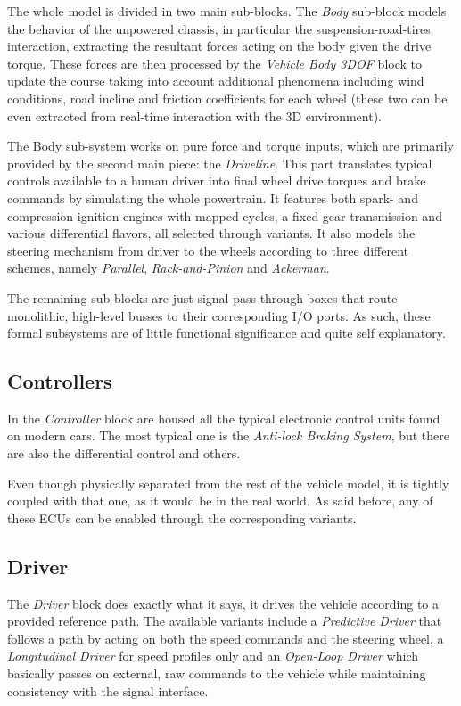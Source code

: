 		The whole model is divided in two main sub-blocks. The \emph{Body} sub-block models the behavior of the unpowered chassis, in particular the suspension-road-tires
		interaction, extracting the resultant forces acting on the body given the drive torque. These forces are then processed by the \emph{Vehicle Body 3DOF} block to
		update the course taking into account additional phenomena including wind conditions, road incline and friction coefficients for each wheel (these two can be even
		extracted from real-time interaction with the 3D environment).

		The Body sub-system works on pure force and torque inputs, which are primarily provided by the second main piece: the \emph{Driveline}.
		This part translates typical controls available to a human driver into final wheel drive torques and brake commands by simulating the whole powertrain.
		It features both spark- and compression-ignition engines with mapped cycles, a fixed gear transmission and various differential flavors, all selected through variants.
		It also models the steering mechanism from driver to the wheels according to three different schemes, namely \emph{Parallel}, \emph{Rack-and-Pinion} and
		\emph{Ackerman}.

		The remaining sub-blocks are just signal pass-through boxes that route monolithic, high-level busses to their corresponding I/O ports. As such, these formal subsystems
		are of little functional significance and quite self explanatory.


		\subsection{Controllers}

		In the \emph{Controller} block are housed all the typical electronic control units found on modern cars. The most typical one is the \emph{Anti-lock Braking System},
		but there are also the differential control and others. 

		Even though physically separated from the rest of the vehicle model, it is tightly coupled with that one, as it would be in the real world. As said before, any of these ECUs
		can be enabled through the corresponding variants.

		\subsection{Driver}
		\label{ssec:vs-env-drv}

		The \emph{Driver} block does exactly what it says, it drives the vehicle according to a provided reference path.
		The available variants include a \emph{Predictive Driver} that follows a path by acting on both the speed commands and the steering wheel,
		a \emph{Longitudinal Driver} for speed profiles only and an \emph{Open-Loop Driver} which basically passes on external, raw commands to the vehicle
		while maintaining consistency with the signal interface.
		
